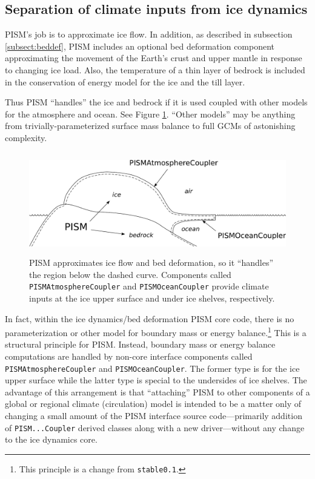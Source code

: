 \documentclass[11pt,final]{amsart}
\renewcommand{\t}[1]{\texttt{#1}}
\begin{document}
\subsection{Separation of climate inputs from ice dynamics}\label{subsect:separateclimate}  
PISM's job is to approximate ice flow.  In addition, as described in subsection \ref{subsect:beddef}, PISM includes an optional bed deformation component approximating the movement of the Earth's crust and upper mantle in response to changing ice load.  Also, the temperature of a thin layer of bedrock is included in the conservation of energy model for the ice and the till layer.

Thus PISM ``handles'' the ice and bedrock if it is used coupled with other models for the atmosphere and ocean.  See Figure \ref{fig:climatecartoon}.  ``Other models'' may be anything from trivially-parameterized surface mass balance to full GCMs of astonishing complexity.

\begin{figure}[ht]
\vspace{0.2in}
\includegraphics[height=1.75in,keepaspectratio=true]{figs/climate_cartoon}

\vspace{0.1in}
\caption{PISM approximates ice flow and bed deformation, so it ``handles'' the region below the dashed curve.  Components called \t{PISMAtmosphereCoupler} and \t{PISMOceanCoupler} provide climate inputs at the ice upper surface and under ice shelves, respectively.}
\label{fig:climatecartoon}
\end{figure}

In fact, within the ice dynamics/bed deformation PISM core code, there is no parameterization or other model for boundary mass or energy balance.\footnote{This principle is a change from \t{stable0.1}.}  This is a structural principle for PISM.  Instead, boundary mass or energy balance computations are handled by non-core interface components called \t{PISMAtmosphereCoupler} and \t{PISMOceanCoupler}.   The former type is for the ice upper surface while the latter type is special to the undersides of ice shelves.  The advantage of this arrangement is that ``attaching'' PISM to other components of a global or regional climate (circulation) model is intended to be a matter only of changing a small amount of the PISM interface source code---primarily addition of \t{PISM...Coupler} derived classes along with a new driver---without any change to the ice dynamics core.
\end{document}
